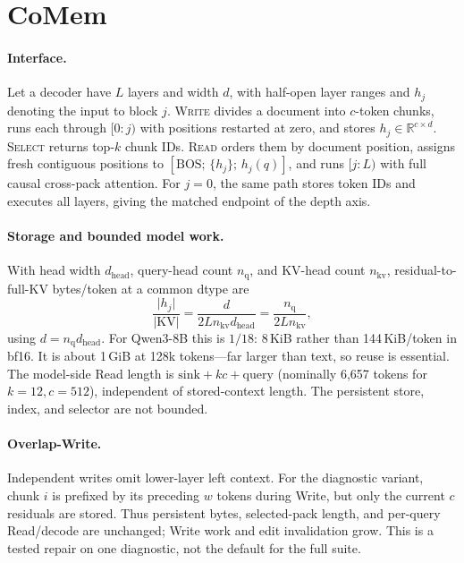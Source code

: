 \section{CoMem}
\label{sec:method}

\paragraph{Interface.}
Let a decoder have $L$ layers and width $d$, with half-open layer ranges and
$h_j$ denoting the input to block $j$. \textsc{Write} divides a document into
$c$-token chunks, runs each through $[0{:}j)$ with positions restarted at zero,
and stores $h_j\in\mathbb{R}^{c\times d}$. \textsc{Select} returns top-$k$
chunk IDs. \textsc{Read} orders them by document position, assigns fresh
contiguous positions to $[\mathrm{BOS};\,\{h_j\};\,h_j(q)]$, and runs
$[j{:}L)$ with full causal cross-pack attention. For $j{=}0$, the same path
stores token IDs and executes all layers, giving the matched endpoint of the
depth axis.

\paragraph{Storage and bounded model work.}
With head width $d_{\mathrm{head}}$, query-head count $n_{\mathrm q}$, and
KV-head count $n_{\mathrm{kv}}$, residual-to-full-KV bytes/token at a common
dtype are
\begin{equation}
\frac{\lvert h_j\rvert}{\lvert\mathrm{KV}\rvert}
=\frac{d}{2L n_{\mathrm{kv}}d_{\mathrm{head}}}
=\frac{n_{\mathrm{q}}}{2L n_{\mathrm{kv}}},
\label{eq:store}
\end{equation}
using $d=n_{\mathrm q}d_{\mathrm{head}}$. For Qwen3-8B this is $1/18$:
8\,KiB rather than 144\,KiB/token in bf16. It is about 1\,GiB at 128k
tokens---far larger than text, so reuse is essential. The model-side Read length
is $\mathrm{sink}+kc+\mathrm{query}$ (nominally 6,657 tokens for
$k{=}12,c{=}512$), independent of stored-context length. The persistent store,
index, and selector are not bounded.

\paragraph{Overlap-Write.}
Independent writes omit lower-layer left context. For the diagnostic variant,
chunk $i$ is prefixed by its preceding $w$ tokens during Write, but only the
current $c$ residuals are stored. Thus persistent bytes, selected-pack length,
and per-query Read/decode are unchanged; Write work and edit invalidation grow.
This is a tested repair on one diagnostic, not the default for the full suite.

